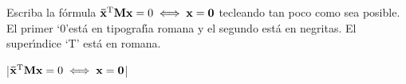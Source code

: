 

\bigskip

\enunciadoS Escriba la f\'ormula 
$\bf\bar x^{\rm T} Mx={\rm0}\iff x=0$ tecleando tan poco 
como sea posible. El primer `0'est\'a en tipograf\'{\i}a romana y el
segundo est\'a en negritas. El super\'{\i}ndice `T' est\'a en romana.

\bigskip

\respuestaS |$\bf\bar x^{\rm T} Mx={\rm0}\iff x=0$|

\bye

